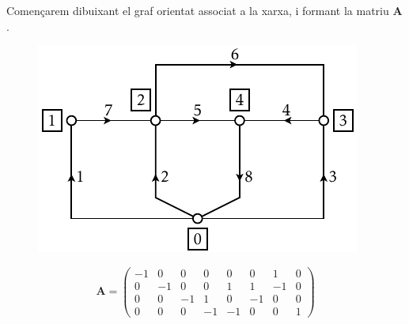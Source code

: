 \begin{exemple}
Comen\c{c}arem dibuixant el graf orientat associat a la xarxa, i formant la matriu $\boldsymbol{A}$.
\begin{figure}[htb]
\hfill
\begin{minipage}[c]{7cm}
    \includegraphics{Imatges/Cap-ResXarxElec-Exemple-Graf.pdf}
\end{minipage}
\hfill
\begin{minipage}[c]{9cm}
   \[
   \boldsymbol{A} = \left( \begin{array}{rrrrrrrr}
     -1 & 0 & 0 & 0 & 0 & 0 & 1 & 0 \\
     0 & -1 & 0 & 0 & 1 & 1 & -1 & 0 \\
     0 & 0 & -1 & 1 & 0 & -1 & 0 & 0 \\
     0 & 0 & 0 & -1 & -1 & 0 & 0 & 1
   \end{array}\right)
   \]
\end{minipage}
\hfill{}
\end{figure}


\end{exemple}
